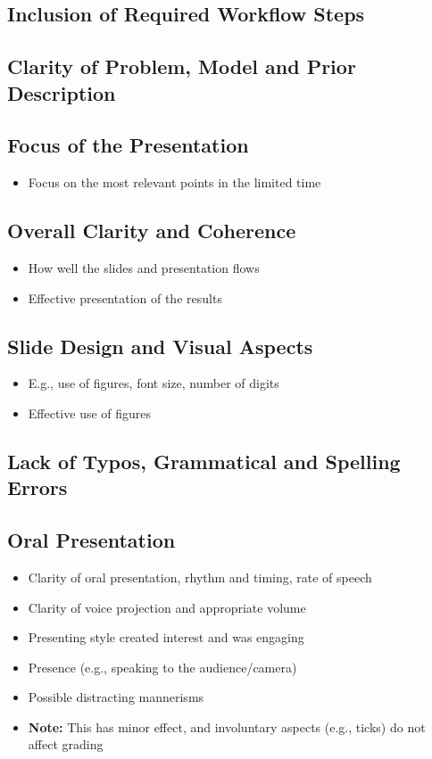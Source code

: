 \documentclass[11pt,a4paper]{article}
\begin{document}
\subsection{Inclusion of Required Workflow Steps}

\subsection{Clarity of Problem, Model and Prior Description}

\subsection{Focus of the Presentation}
\begin{itemize}[label=--]
    \item Focus on the most relevant points in the limited time
\end{itemize}

\subsection{Overall Clarity and Coherence}
\begin{itemize}[label=--]
    \item How well the slides and presentation flows
    \item Effective presentation of the results
\end{itemize}

\subsection{Slide Design and Visual Aspects}
\begin{itemize}[label=--]
    \item E.g., use of figures, font size, number of digits
    \item Effective use of figures
\end{itemize}

\subsection{Lack of Typos, Grammatical and Spelling Errors}

\subsection{Oral Presentation}
\begin{itemize}[label=--]
    \item Clarity of oral presentation, rhythm and timing, rate of speech
    \item Clarity of voice projection and appropriate volume
    \item Presenting style created interest and was engaging
    \item Presence (e.g., speaking to the audience/camera)
    \item Possible distracting mannerisms
    \item \textbf{Note:} This has minor effect, and involuntary aspects (e.g., ticks) do not affect grading
\end{itemize}
\end{document}
